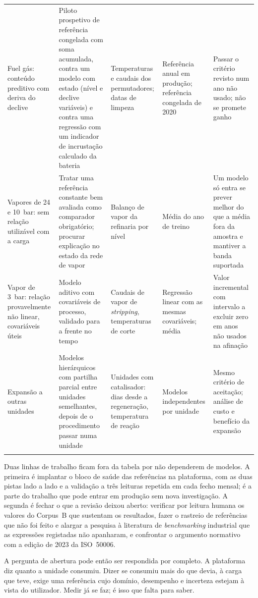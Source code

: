 {\begin{xltabular}{\textwidth}{@{}>{\raggedright\arraybackslash}p{2.6cm}>{\raggedright\arraybackslash}X>{\raggedright\arraybackslash}p{2.6cm}>{\raggedright\arraybackslash}p{2.4cm}>{\raggedright\arraybackslash}X@{}}
    \addlinespace
    Fuel gás: conteúdo preditivo com deriva do declive & Piloto prospetivo de referência congelada com soma acumulada, contra um modelo com estado (nível e declive variáveis) e contra uma regressão com um indicador de incrustação calculado da bateria & Temperaturas e caudais dos permutadores; datas de limpeza & Referência anual em produção; referência congelada de 2020 & Passar o critério revisto num ano não usado; não se promete ganho \\
    \addlinespace
    Vapores de 24 e 10~bar: sem relação utilizável com a carga & Tratar uma referência constante bem avaliada como comparador obrigatório; procurar explicação no estado da rede de vapor & Balanço de vapor da refinaria por nível & Média do ano de treino & Um modelo só entra se prever melhor do que a média fora da amostra e mantiver a banda suportada \\
    \addlinespace
    Vapor de 3~bar: relação provavelmente não linear, covariáveis úteis & Modelo aditivo com covariáveis de processo, validado para a frente no tempo & Caudais de vapor de \emph{stripping}, temperaturas de corte & Regressão linear com as mesmas covariáveis; média & Valor incremental com intervalo a excluir zero em anos não usados na afinação \\
    \addlinespace
    Expansão a outras unidades & Modelos hierárquicos com partilha parcial entre unidades semelhantes, depois de o procedimento passar numa unidade & Unidades com catalisador: dias desde a regeneração, temperatura de reação & Modelos independentes por unidade & Mesmo critério de aceitação; análise de custo e benefício da expansão \\ \\
\end{xltabular}
}

Duas linhas de trabalho ficam fora da tabela por não dependerem de modelos.
A primeira é implantar o bloco de saúde das referências na plataforma, com
as duas pistas lado a lado e a validação a três leituras repetida em cada
fecho mensal; é a parte do trabalho que pode entrar em produção sem nova
investigação. A segunda é fechar o que a revisão deixou aberto: verificar por
leitura humana os valores do Corpus~B que sustentam os resultados, fazer o
rastreio de referências que não foi feito e alargar a pesquisa à literatura
de \emph{benchmarking} industrial que as expressões registadas não
apanharam, e confrontar o argumento normativo com a edição de 2023 da
ISO~50006.

A pergunta de abertura pode então ser respondida por completo. A plataforma
diz quanto a unidade consumiu. Dizer se consumiu mais do que devia, à carga
que teve, exige uma referência cujo domínio, desempenho e incerteza estejam
à vista do utilizador. Medir já se faz; é isso que falta para saber.
